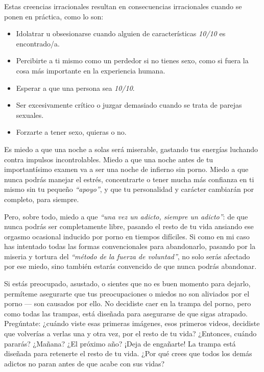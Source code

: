 \documentclass[
  spanish,
  openany]{book}
\providecommand{\tightlist}{%
  \setlength{\itemsep}{0pt}\setlength{\parskip}{0pt}}
\begin{document}
Estas creencias irracionales resultan en consecuencias irracionales cuando se ponen en práctica, como lo son:

\begin{itemize}
\tightlist
\item
  Idolatrar u obsesionarse cuando alguien de características \emph{10/10} es encontrado/a.
\item
  Percibirte a ti mismo como un perdedor si no tienes sexo, como si fuera la cosa más importante en la experiencia humana.
\item
  Esperar a que una persona sea \emph{10/10}.
\item
  Ser excesivamente crítico o juzgar demasiado cuando se trata de parejas sexuales.
\item
  Forzarte a tener sexo, quieras o no.
\end{itemize}

Es miedo a que una noche a solas será miserable, gastando tus energías luchando contra impulsos incontrolables. Miedo a que una noche antes de tu importantísimo examen va a ser una noche de infierno sin porno. Miedo a que nunca podrás manejar el estrés, concentrarte o tener mucha más confianza en ti mismo sin tu pequeño \emph{``apoyo''}, y que tu personalidad y carácter cambiarán por completo, para siempre.

Pero, sobre todo, miedo a que \emph{``una vez un adicto, siempre un adicto''}: de que nunca podrás ser completamente libre, pasando el resto de tu vida ansiando ese orgasmo ocasional inducido por porno en tiempos difíciles. Si como en mi caso has intentado todas las formas convencionales para abandonarlo, pasando por la miseria y tortura del \emph{``método de la fuerza de voluntad''}, no solo serás afectado por ese miedo, sino también estarás convencido de que nunca podrás abandonar.

Si estás preocupado, asustado, o sientes que no es buen momento para dejarlo, permíteme asegurarte que tus preocupaciones o miedos no son aliviados por el porno --- son causados por ello. No decidiste caer en la trampa del porno, pero como todas las trampas, está diseñada para asegurarse de que sigas atrapado. Pregúntate: ¿cuándo viste esas primeras imágenes, esos primeros videos, decidiste que volverías a verlas una y otra vez, por el resto de tu vida? ¿Entonces, cuándo pararás? ¿Mañana? ¿El próximo año? ¡Deja de engañarte! La trampa está diseñada para retenerte el resto de tu vida. ¿Por qué crees que todos los demás adictos no paran antes de que acabe con sus vidas?
\end{document}
